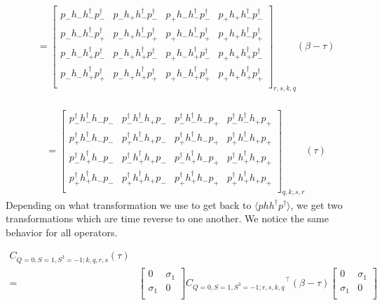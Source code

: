 \renewcommand{\cor}[4]{p_{#3}h_{#4}h^\dagger_{#1}p^\dagger_{#2}}

\begin{equation}
  \begin{aligned}
    &= \left[ 
    {\begin{array}{cccc}
      \cor{-}{-}{-}{-} & \cor{-}{-}{-}{+} & \cor{-}{-}{+}{-} & \cor{-}{-}{+}{+} \\
      \cor{-}{+}{-}{-} & \cor{-}{+}{-}{+} & \cor{-}{+}{+}{-} & \cor{-}{+}{+}{+} \\
      \cor{+}{-}{-}{-} & \cor{+}{-}{-}{+} & \cor{+}{-}{+}{-} & \cor{+}{-}{+}{+} \\
      \cor{+}{+}{-}{-} & \cor{+}{+}{-}{+} & \cor{+}{+}{+}{-} & \cor{+}{+}{+}{+} \\
    \end{array} } 
    \right]_{r,s,k,q} (\beta-\tau) \\
  \end{aligned}
\end{equation}

\renewcommand{\dcor}[4]{p_{#2}^\dagger h_{#1}^\dagger h_{#4} p_{#3}}

\begin{equation}
  \begin{aligned}
    &= \left[ {\begin{array}{cccc}
      \dcor{-}{-}{-}{-} & \dcor{-}{-}{-}{+} & \dcor{-}{-}{+}{-} & \dcor{-}{-}{+}{+} \\
      \dcor{-}{+}{-}{-} & \dcor{-}{+}{-}{+} & \dcor{-}{+}{+}{-} & \dcor{-}{+}{+}{+} \\
      \dcor{+}{-}{-}{-} & \dcor{+}{-}{-}{+} & \dcor{+}{-}{+}{-} & \dcor{+}{-}{+}{+} \\
      \dcor{+}{+}{-}{-} & \dcor{+}{+}{-}{+} & \dcor{+}{+}{+}{-} & \dcor{+}{+}{+}{+} \\
    \end{array} } \right]_{q,k,s,r} (\tau)
  \end{aligned}
\end{equation}
Depending on what transformation we use to get back to $\langle phh^\dagger p^\dagger\rangle$, we get two transformations which are time reverse to one another. We notice the same behavior for all operators.

\begin{equation}
  \begin{aligned}
    C_{Q=0,S=1,S^3=-1;k,q,r,s} (\tau) \\
    =& \left[ {\begin{array}{cc}
      0 & \sigma_1 \\
      \sigma_1 & 0 \\
    \end{array} } \right]
    {C_{Q=0,S=1,S^3=-1;r,s,k,q}}^\top (\beta-\tau)
    \left[ {\begin{array}{cc}
      0 & \sigma_1 \\
      \sigma_1 & 0 \\
    \end{array} } \right]
  \end{aligned}
\end{equation}

